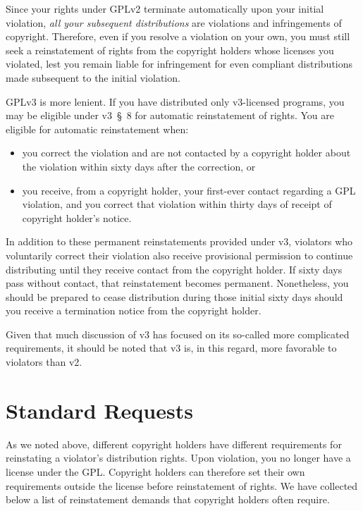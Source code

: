 Since your rights under GPLv2 terminate automatically upon your initial
violation, \emph{all your subsequent distributions} are violations and
infringements of copyright.  Therefore, even if you resolve a violation on
your own, you must still seek a reinstatement of rights from the copyright
holders whose licenses you violated, lest you remain liable for
infringement for even compliant distributions made subsequent to the
initial violation.

GPLv3 is more lenient.  If you have distributed only v3-licensed programs,
you may be eligible under v3~\S~8 for automatic reinstatement of rights.
You are eligible for automatic reinstatement when:
\begin{itemize}
\item you correct the violation and are not contacted by a copyright
  holder about the violation within sixty days after the correction, or

\item you receive, from a copyright holder, your first-ever contact
  regarding a GPL violation, and you correct that violation within thirty
  days of receipt of copyright holder's notice.
\end{itemize}

In addition to these permanent reinstatements provided under v3, violators
who voluntarily correct their violation also receive provisional
permission to continue distributing until they receive contact from the
copyright holder.  If sixty days pass without contact, that reinstatement
becomes permanent.  Nonetheless, you should be prepared to cease
distribution during those initial sixty days should you receive a
termination notice from the copyright holder.

Given that much discussion of v3 has focused on its so-called more
complicated requirements, it should be noted that v3 is, in this regard,
more favorable to violators than v2.

\chapter{Standard Requests}

As we noted above, different copyright holders have different requirements
for reinstating a violator's distribution rights.  Upon violation, you no
longer have a license under the GPL\@.  Copyright holders can therefore
set their own requirements outside the license before reinstatement of
rights.  We have collected below a list of reinstatement demands that
copyright holders often require.

